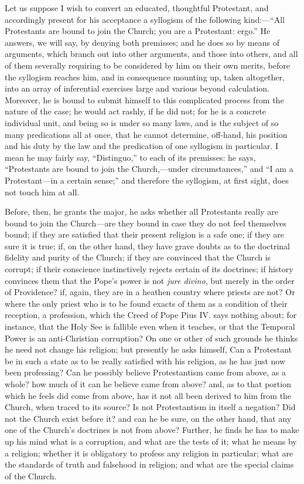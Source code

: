 Let us suppose I wish to convert an educated, thoughtful
Protestant, and accordingly present for his acceptance a syllogism of
the following kind:—``All Protestants are bound to join the
Church; you are a Protestant: ergo.'' He answers, we will say, by
denying both premisses; and he does so by means of arguments,
which branch out into other arguments, and those into others, and all
of them severally requiring to be considered by him on their own
merits, before the syllogism reaches him, and in consequence mounting
up, taken altogether, into an array of inferential exercises large and
various beyond calculation. Moreover, he is bound to submit himself to
this complicated process from the nature of the case; he would act
rashly, if he did not; for he is a concrete individual unit, and being
so is under so many laws, and is the subject of so many predications
all at once, that he cannot determine, off-hand, his position and his
duty by the law and the predication of one syllogism in particular. I
mean he may fairly say, ``Distinguo,'' to each of its
premisses: he says, ``Protestants are bound to join the Church,—under
circumstances,'' and ``I am a Protestant—in a certain
sense;'' and therefore the syllogism, at first sight, does not
touch him at all.

Before, then, he grants the major, he asks whether all Protestants
really are bound to join the Church—are they bound in case they do
not feel themselves bound; if they are satisfied that their present
religion is a safe one; if they are sure it is true; if, on the other
hand, they have grave doubts as to the doctrinal fidelity and purity
of the Church; if they are convinced that the Church is corrupt; if
their conscience instinctively rejects certain of its doctrines; if
history convinces them that the Pope's power is not \emph{jure divino},
but merely in the order of Providence? if, again, they are in a
heathen country where priests are not? Or where the only priest
who is to be found exacts of them as a condition of their reception, a
profession, which the Creed of Pope Pius IV. says nothing about; for
instance, that the Holy See is fallible even when it teaches, or that
the Temporal Power is an anti-Christian corruption? On one or other of
such grounds he thinks he need not change his religion; but presently
he asks himself, Can a Protestant be in such a state as to be really
satisfied with his religion, as he has just now been professing? Can
he possibly believe Protestantism came from above, as a whole? how
much of it can he believe came from above? and, as to that portion
which he feels did come from above, has it not all been derived to him
from the Church, when traced to its source? Is not Protestantism in
itself a negation? Did not the Church exist before it? and can he be
sure, on the other hand, that any one of the Church's doctrines is not
from above? Further, he finds he has to make up his mind what is a
corruption, and what are the tests of it; what he means by a religion;
whether it is obligatory to profess any religion in particular; what
are the standards of truth and falsehood in religion; and what are the
special claims of the Church.

